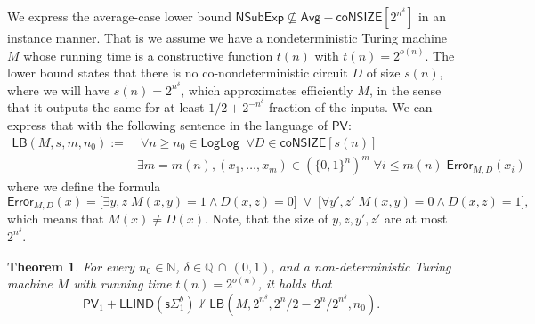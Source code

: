 \documentclass[11pt]{article}
\newcommand{\N}{\mathbb{N}}
\newcommand{\PV}{\mathsf{PV}}
\newtheorem{theorem}{Theorem}[section]
\theoremstyle{definition}
\theoremstyle{definition}
\theoremstyle{remark}
\begin{document}
We express the average-case lower bound $\mathsf{NSubExp} \not\subseteq \mathsf{Avg-} \mathsf{coNSIZE}[2^{n^\delta}]$ in an instance manner. That is we assume we have a nondeterministic Turing machine $M$ whose running time is a constructive function $t(n)$ with $t(n)=2^{o(n)}$. The lower bound states that there is no co-nondeterministic circuit $D$ of size $s(n)$, where we will have $s(n)=2^{n^\delta}$, which approximates efficiently $M$, in the sense that it outputs the same for at least $1/2+2^{-n^\delta}$ fraction of the inputs. We can express that with the following sentence in the language of $\PV$:
\begin{align*}
\mathsf{LB}(M,s,m,n_0):= & \;\forall n\geq n_0\in \mathsf{LogLog}\;\; \forall D\in \mathsf{coNSIZE}[s(n)]\\
& \exists m=m(n), (x_1,\dots,x_{m})\in (\{0,1\}^n)^m\; \forall i\leq m(n)\;\mathsf{Error}_{M,D}(x_i)
\end{align*}
where we define the formula
$$
\mathsf{Error}_{M,D}(x) = \big[\exists y,z \; M(x,y)=1\land D(x,z)=0 \big]\; \lor\;  \big[\forall y',z' \; M(x,y)=0\land D(x,z)=1 \big],
$$
which means that $M(x)\neq D(x)$. Note, that the size of $y,z,y',z'$ are at most $2^{n^\delta}$.

\begin{theorem}\label{theorempsllind}
    For every $n_0\in \N$, $\delta\in \mathbb{Q} \,\cap\, (0,1)$, and a non-deterministic Turing machine $M$ with running time $t(n)=2^{o(n)}$, it holds that
    $$
    \PV_1+\mathsf{LLIND}(\mathsf{s}\Sigma^b_1)\not\vdash \mathsf{LB}(M,2^{n^\delta},2^n/2-2^n/2^{n^\delta},n_0).
    $$
\end{theorem}
\end{document}
